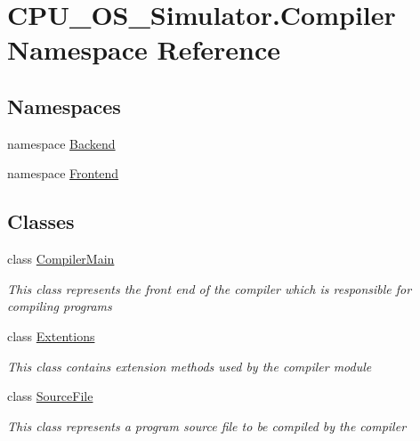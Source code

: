 \hypertarget{namespace_c_p_u___o_s___simulator_1_1_compiler}{}\section{C\+P\+U\+\_\+\+O\+S\+\_\+\+Simulator.\+Compiler Namespace Reference}
\label{namespace_c_p_u___o_s___simulator_1_1_compiler}
\subsection*{Namespaces}
\begin{DoxyCompactItemize}
\item 
namespace \hyperlink{namespace_c_p_u___o_s___simulator_1_1_compiler_1_1_backend}{Backend}
\item 
namespace \hyperlink{namespace_c_p_u___o_s___simulator_1_1_compiler_1_1_frontend}{Frontend}
\end{DoxyCompactItemize}
\subsection*{Classes}
\begin{DoxyCompactItemize}
\item 
class \hyperlink{class_c_p_u___o_s___simulator_1_1_compiler_1_1_compiler_main}{Compiler\+Main}
\begin{DoxyCompactList}\small\item\em This class represents the front end of the compiler which is responsible for compiling programs \end{DoxyCompactList}\item 
class \hyperlink{class_c_p_u___o_s___simulator_1_1_compiler_1_1_extentions}{Extentions}
\begin{DoxyCompactList}\small\item\em This class contains extension methods used by the compiler module \end{DoxyCompactList}\item 
class \hyperlink{class_c_p_u___o_s___simulator_1_1_compiler_1_1_source_file}{Source\+File}
\begin{DoxyCompactList}\small\item\em This class represents a program source file to be compiled by the compiler \end{DoxyCompactList}\end{DoxyCompactItemize}

